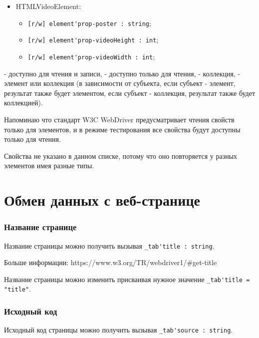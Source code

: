\documentclass[a4paper, 14pt]{extarticle}
\newenvironment{icItems}
	{ \begin{itemize} [noitemsep,nolistsep] }
	{ \end{itemize} }
\begin{document}
\begin{icItems}
	\item HTMLVideoElement:
	\begin{icItems}
		\item \lstinline|[r/w] element'prop-poster : string|;
		\item \lstinline|[r/w] element'prop-videoHeight : int|;
		\item \lstinline|[r/w] element'prop-videoWidth : int|;
	\end{icItems}
	
\end{icItems}

\code{[r/w]} - доступно для чтения и записи, \code{[r/o]} - доступно только для чтения,  - коллекция,  - элемент или коллекция (в зависимости от субъекта, если субъект - элемент, результат также будет элементом, если субъект - коллекция, результат также будет коллекцией). 

Напоминаю что стандарт W3C WebDriver предусматривает чтения свойств только для элементов, и в режиме тестирования все свойства будут доступны только для чтения.

Свойства  не указано в данном списке, потому что оно повторяется у разных элементов имея разные типы.

\newpage
\section{Обмен данных с веб-странице}
\label{dataexchange}

\subsubsection{Название странице}

Название страницы можно получить вызывая \lstinline|_tab'title : string|.

Больше информации: https://www.w3.org/TR/webdriver1/\#get-title

\code{[icL]} Название страницы можно изменить присваивая нужное значение \lstinline|_tab'title = "title"|.

\subsubsection{Исходный код}

Исходный код страницы можно получить вызывая \lstinline|_tab'source : string|.
\end{document}
